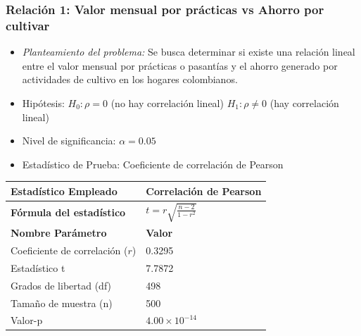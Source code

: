\documentclass[12pt,a4paper]{article}
\begin{document}
\subsubsection*{Relación 1: Valor mensual por prácticas vs Ahorro por cultivar}

\begin{itemize}
    \item \textit{Planteamiento del problema:} Se busca determinar si existe una relación lineal entre el valor mensual por prácticas o pasantías y el ahorro generado por actividades de cultivo en los hogares colombianos.
    \item Hipótesis: \quad $H_0: \rho = 0$ (no hay correlación lineal) \hspace{1cm} $H_1: \rho \neq 0$ (hay correlación lineal)
    \item Nivel de significancia: $\alpha = 0.05$
    \item Estadístico de Prueba: Coeficiente de correlación de Pearson
\end{itemize}

\begin{tabular}{|m{7cm}|m{7cm}|}
\hline
\textbf{Estadístico Empleado} & Correlación de Pearson \\ \hline
\textbf{Fórmula del estadístico} & $t = r\sqrt{\frac{n-2}{1-r^2}}$ \\ \hline
\textbf{Nombre Parámetro} & \textbf{Valor} \\ \hline
Coeficiente de correlación ($r$) & 0.3295 \\ \hline
Estadístico t & 7.7872 \\ \hline
Grados de libertad (df) & 498 \\ \hline
Tamaño de muestra (n) & 500 \\ \hline
Valor-p & $4.00 \times 10^{-14}$ \\ \hline
\end{tabular}
\end{document}
